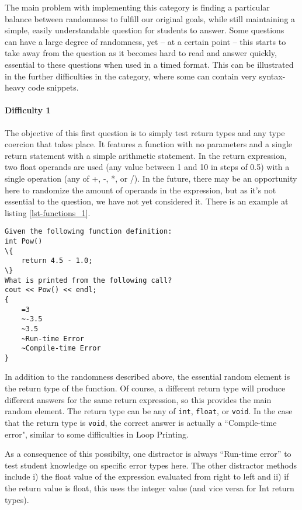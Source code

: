 \documentclass{article}
\begin{document}
The main problem with implementing this category is finding a particular balance between randomness to fulfill our original goals, while still maintaining a simple, easily understandable question for students to answer. Some questions can have a large degree of randomness, yet -- at a certain point -- this starts to take away from the question as it becomes hard to read and answer quickly, essential to these questions when used in a timed format. This can be illustrated in the further difficulties in the category, where some can contain very syntax-heavy code snippets.

\paragraph{Difficulty 1} \hfill \par

The objective of this first question is to simply test return types and any type coercion that takes place. It features a function with no parameters and a single return statement with a simple arithmetic statement. In the return expression, two float operands are used (any value between 1 and 10 in steps of 0.5) with a single operation (any of +, -, *, or /). In the future, there may be an opportunity here to randomize the amount of operands in the expression, but as it's not essential to the question, we have not yet considered it. There is an example at listing \ref{lst-functions_1}.

\begin{lstlisting}[caption={\textbf{Functions} Difficulty 1 GIFT Example}, label=lst-functions_1]
Given the following function definition:
int Pow() 
\{ 
	return 4.5 - 1.0; 
\}
What is printed from the following call? 
cout << Pow() << endl;
{
	=3
	~-3.5
	~3.5
	~Run-time Error
	~Compile-time Error
} 
\end{lstlisting}


In addition to the randomness described above, the essential random element is the return type of the function. Of course, a different return type will produce different answers for the same return expression, so this provides the main random element. The return type can be any of  \texttt{int}, \texttt{float}, or \texttt{void}. In the case that the return type is \texttt{void}, the correct
answer is actually a ``Compile-time error", similar to some difficulties in Loop Printing. 

As a consequence of this possibilty, one distractor is always ``Run-time error'' to test student knowledge on specific error types here. The other distractor methods include i) the float value
of the expression evaluated from right to left and ii) if the return value is float, this uses the integer value (and vice versa for Int return types).
\end{document}
